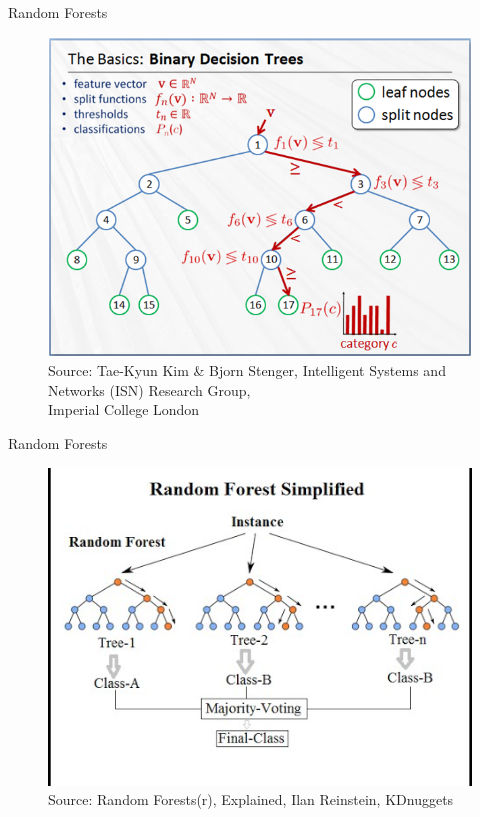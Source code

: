 \documentclass{beamer}
\begin{document}
\begin{frame}{Random Forests \parencite{DBLP:journals/ml/Breiman01}}
  \begin{figure}
    \centering
    \includegraphics[scale=0.5]{random_forests_2.png} \\
    {\tiny\color{gray}Source: Tae-Kyun Kim \& Bjorn Stenger, Intelligent Systems and Networks (ISN) Research Group,\\[-7pt] Imperial College London}
  \end{figure}
\end{frame}

\begin{frame}{Random Forests \parencite{DBLP:journals/ml/Breiman01}}
  \begin{figure}
    \centering
    \includegraphics[scale=0.5]{rand-forest-1.jpg} \\
    {\tiny\color{gray}Source: Random Forests(r), Explained, Ilan Reinstein, KDnuggets}
  \end{figure}
\end{frame}
\end{document}
